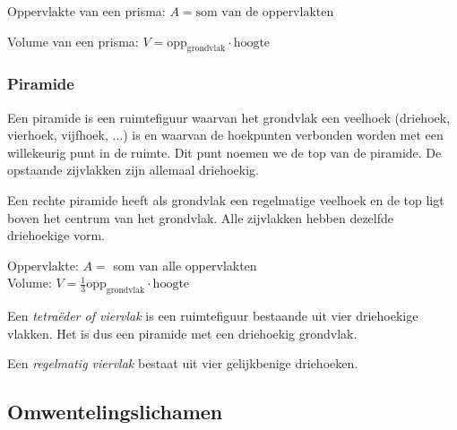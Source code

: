 \begin{ftonthoud}
			
		Oppervlakte van een prisma: $A=\text{som van de oppervlakten}$
		
		Volume van een prisma: $V=\text{opp}_{\text{grondvlak}}\cdot \text{hoogte}$

\end{ftonthoud}		

\subsubsection{Piramide}
\begin{definitie}
	Een piramide is een ruimtefiguur waarvan het grondvlak een veelhoek (driehoek, vierhoek, vijfhoek, $\ldots$) is en waarvan de hoekpunten verbonden worden met een willekeurig punt in de ruimte. Dit punt noemen we de top van de piramide. De opstaande zijvlakken zijn allemaal driehoekig. 

\end{definitie}
Een rechte piramide heeft als grondvlak een regelmatige veelhoek en de top ligt boven het centrum van het grondvlak. Alle zijvlakken hebben dezelfde driehoekige vorm.

%



\begin{ftonthoud}
	Oppervlakte: $A=$ som van alle oppervlakten
\\
Volume: $V=\frac{1}{3}\text{opp}_{\text{grondvlak}}\cdot \text{hoogte}$
\end{ftonthoud}

\begin{definitie}
	Een \emph{tetra\"eder of viervlak} is een ruimtefiguur bestaande uit vier driehoekige vlakken. Het is dus een piramide met een driehoekig grondvlak.

Een \emph{regelmatig viervlak} bestaat uit vier gelijkbenige driehoeken.

\end{definitie}

\subsection{Omwentelingslichamen}

